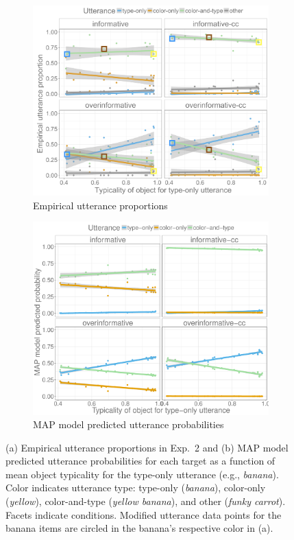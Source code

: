 \documentclass[11pt]{article}
\begin{document}
\begin{figure}
\centering
	\begin{subfigure}{.85\textwidth}
		\centering
		\includegraphics[width=.8\textwidth]{pics/empiricalProportions_typ.png}
		\caption{Empirical utterance proportions}
		\label{fig:exp2empirical}
	\end{subfigure}
	
	\begin{subfigure}{.85\textwidth}
		\centering
		\includegraphics[width=.8\textwidth]{pics/exp2-none-fixedplusempirical-predictives}
		\caption{MAP model predicted utterance probabilities}
		\label{fig:exp2model}
	\end{subfigure}
\caption{(a) Empirical utterance proportions in Exp.~2 and (b) MAP model predicted utterance probabilities for each target as a function of mean object typicality for the type-only utterance (e.g., \emph{banana}). Color indicates utterance type: type-only (\emph{banana}), color-only (\emph{yellow}), color-and-type (\emph{yellow banana}), and other (\emph{funky carrot}). Facets indicate conditions. Modified utterance data points for the banana items are circled in the banana's respective color in (a).}
\label{fig:exp2results}
\end{figure}
\end{document}
